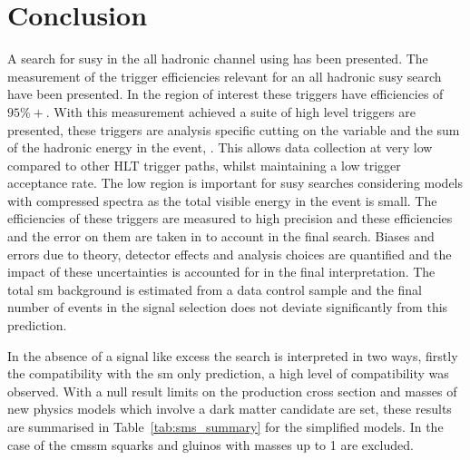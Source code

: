 \chapter{Conclusion} %
\label{cha:conclusion}
A search for \ac{susy} in the all hadronic channel using \alt has been 
presented.
The measurement of the \Lone trigger efficiencies relevant for an all hadronic 
\ac{susy} search have been presented. In the region of interest these triggers 
have efficiencies of $95\%+$. With this measurement achieved a suite of high 
level triggers are presented, these triggers are analysis specific cutting on 
the \alt variable and the sum of the hadronic energy in the event, \HT. This 
allows data collection at very low \HT compared to other HLT trigger paths, 
whilst maintaining a low trigger acceptance rate. The low \HT region is 
important for \ac{susy} searches considering models with compressed spectra as 
the total visible energy in the event is small. The efficiencies of these 
triggers are measured to high precision and these efficiencies and the error on 
them are taken in to account in the final search. Biases and errors due to 
theory, detector effects and analysis choices are quantified and the impact of 
these uncertainties is accounted for in the final interpretation.
The total \ac{sm} background is estimated from a data control sample and the 
final number of events in the signal selection does not deviate significantly 
from this prediction.



In the absence of a signal like excess the search is interpreted in two ways, 
firstly the compatibility with the \ac{sm} only prediction, a high level of 
compatibility was observed. With a null result limits on the production cross 
section and masses of new physics models which involve a dark matter candidate 
are set, these results are summarised in Table~\ref{tab:sms_summary} for the 
simplified models. In the case of the \ac{cmssm} squarks and gluinos with 
masses up to \unit{1}{\TeV} are excluded.



